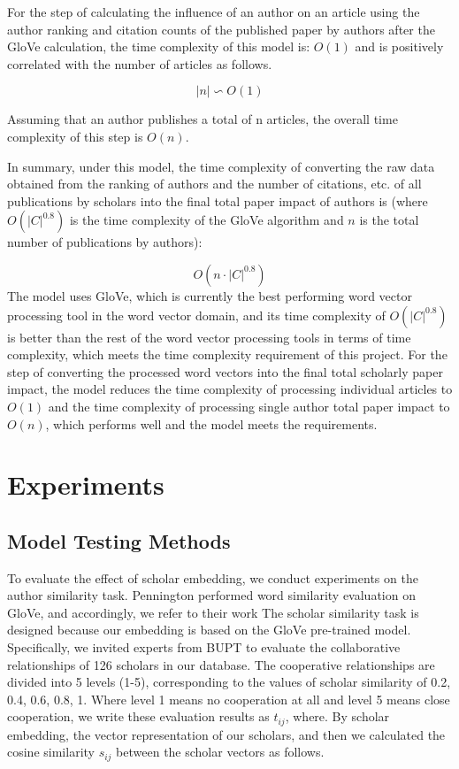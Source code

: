 \documentclass[conference]{IEEEtran}
\begin{document}
For the step of calculating the influence of an author on an article
using the author ranking and citation counts of the published paper
by authors after the GloVe calculation, the time complexity of this
model is: \(O(1)\) and is positively correlated with the number of
articles as follows.

\begin{equation}\label{eq:complexity}
    \mid n \mid \backsim O(1)
\end{equation}

Assuming that an author publishes a total of n articles, the overall
time complexity of this step is \(O(n)\).

In summary, under this model, the time complexity of converting the raw
data obtained from the ranking of authors and the number of citations,
etc. of all publications by scholars into the final total paper
impact of authors is (where \(O(|C|^{0.8})\) is the time complexity of
the GloVe algorithm and \(n\) is the total number of publications by
authors):

\begin{equation}\label{eq:complexity2}
    O(n \cdot |C|^{0.8})
\end{equation}
The model uses GloVe, which is currently the best performing word vector
processing tool in the word vector domain, and its time complexity of
\(O(|C|^{0.8})\) is better than the rest of the word vector processing
tools in terms of time complexity, which meets the time complexity
requirement of this project. For the step of converting the processed
word vectors into the final total scholarly paper impact, the model
reduces the time complexity of processing individual articles to
\(O(1)\) and the time complexity of processing single author total
paper impact to \(O(n)\), which performs well and the model meets
the requirements.



\section{Experiments}
\subsection{Model Testing Methods}

To evaluate the effect of scholar embedding, we conduct experiments on
the author similarity task. Pennington \cite{GloVe}
performed word similarity evaluation \cite{https://doi.org/10.48550/arxiv.2211.08203} on GloVe, and accordingly, we refer
to their work The scholar similarity task is designed because our
embedding is based on the GloVe pre-trained model. Specifically, we
invited experts from BUPT to evaluate the collaborative relationships of 126 scholars in our
database. The cooperative relationships are divided into 5 levels (1-5), corresponding to the values of scholar similarity of 0.2, 0.4,
0.6, 0.8, 1. Where level 1 means no cooperation at all and level 5 means
close cooperation, we write these evaluation results as \(t_{ij}\),
where. By scholar embedding, the vector representation of our scholars,
and then we calculated the cosine similarity \(s_{ij}\) between the
scholar vectors as follows.
\end{document}
